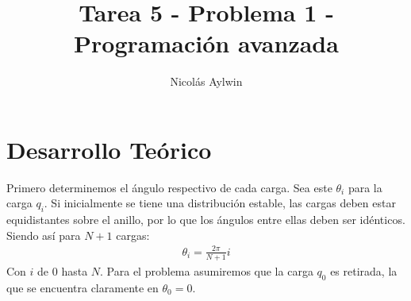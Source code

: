 \documentclass[12pt]{article}
\title{Tarea 5 - Problema 1 - Programación avanzada}
\author{Nicolás Aylwin}
\date{}
\begin{document}
\maketitle
\section{Desarrollo Teórico}
Primero determinemos el ángulo respectivo de cada carga. Sea este $\theta _i$ para la carga $q_i$. Si inicialmente se tiene una distribución estable, las cargas deben estar equidistantes sobre el anillo, por lo que los ángulos entre ellas deben ser idénticos. Siendo así para $N+1$ cargas:
\begin{align}
\label{pos}
\theta _i=\frac{2\pi}{N+1}i
\end{align}
Con $i$ de $0$ hasta $N$. Para el problema asumiremos que la carga $q_0$ es retirada, la que se encuentra claramente en $\theta _0=0$.
\end{document}
